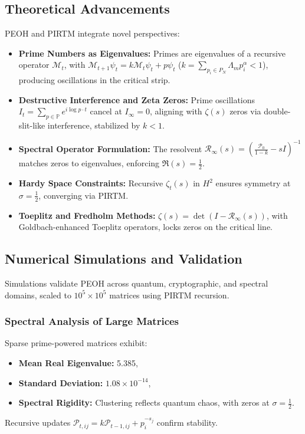 \documentclass[11pt]{article}
\theoremstyle{plain}
\begin{document}
\subsection{Theoretical Advancements}
PEOH and PIRTM integrate novel perspectives:
\begin{itemize}
    \item \textbf{Prime Numbers as Eigenvalues:} Primes are eigenvalues of a recursive operator \( \mathcal{M}_t \), with \( \mathcal{M}_{t+1} \psi_t = k \mathcal{M}_t \psi_t + p \psi_t \) (\( k = \sum_{p_i \in P_N} \Lambda_m p_i^\alpha < 1 \)), producing oscillations in the critical strip.
    \item \textbf{Destructive Interference and Zeta Zeros:} Prime oscillations \( I_t = \sum_{p \in \mathbb{P}} e^{i \log p \cdot t} \) cancel at \( I_\infty = 0 \), aligning with \( \zeta(s) \) zeros via double-slit-like interference, stabilized by \( k < 1 \).
    \item \textbf{Spectral Operator Formulation:} The resolvent \( \mathcal{R}_\infty(s) = \left( \frac{\mathcal{P}_0}{1 - k} - s I \right)^{-1} \) matches zeros to eigenvalues, enforcing \( \Re(s) = \frac{1}{2} \).
    \item \textbf{Hardy Space Constraints:} Recursive \( \zeta_t(s) \) in \( H^2 \) ensures symmetry at \( \sigma = \frac{1}{2} \), converging via PIRTM.
    \item \textbf{Toeplitz and Fredholm Methods:} \( \zeta(s) = \det(I - \mathcal{R}_\infty(s)) \), with Goldbach-enhanced Toeplitz operators, locks zeros on the critical line.
\end{itemize}

\subsection{Numerical Simulations and Validation}
Simulations validate PEOH across quantum, cryptographic, and spectral domains, scaled to \( 10^5 \times 10^5 \) matrices using PIRTM recursion.

\subsubsection{Spectral Analysis of Large Matrices}
Sparse prime-powered matrices exhibit:
\begin{itemize}
    \item \textbf{Mean Real Eigenvalue:} 5.385,
    \item \textbf{Standard Deviation:} \( 1.08 \times 10^{-14} \),
    \item \textbf{Spectral Rigidity:} Clustering reflects quantum chaos, with zeros at \( \sigma = \frac{1}{2} \).
\end{itemize}
Recursive updates \( \mathcal{P}_{t,ij} = k \mathcal{P}_{t-1,ij} + p_i^{-s_j} \) confirm stability.
\end{document}

